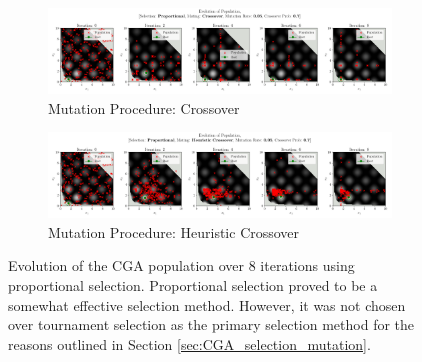 \documentclass[10pt]{article}
\begin{document}
\begin{figure}[H]
    \centering
    \begin{subfigure}{0.85\textwidth}
        \centering
        \includegraphics[width=\textwidth]{../figures/KBF/10_iters/Proportional/Crossover/0.05_0.7_Population.png}
        \caption{Mutation Procedure: Crossover}
        \label{fig:CGA_flowchart_proportional_crossover}
    \end{subfigure}
    \begin{subfigure}{0.85\textwidth}
        \centering
        \includegraphics[width=\textwidth]{../figures/KBF/10_iters/Proportional/Heuristic Crossover/0.05_0.7_Population.png}
        \caption{Mutation Procedure: Heuristic Crossover}
        \label{fig:CGA_flowchart_proportional_Heuristic Crossover}
    \end{subfigure}
    \captionsetup{justification=centering}
    \caption{Evolution of the CGA population over 8 iterations using proportional selection. Proportional selection proved to be a somewhat effective selection method. However, it was not chosen over tournament selection as the primary selection method for the reasons outlined in Section \ref{sec:CGA_selection_mutation}.}
    \label{fig:CGA_flowchart_proportional}
\end{figure}
\end{document}
